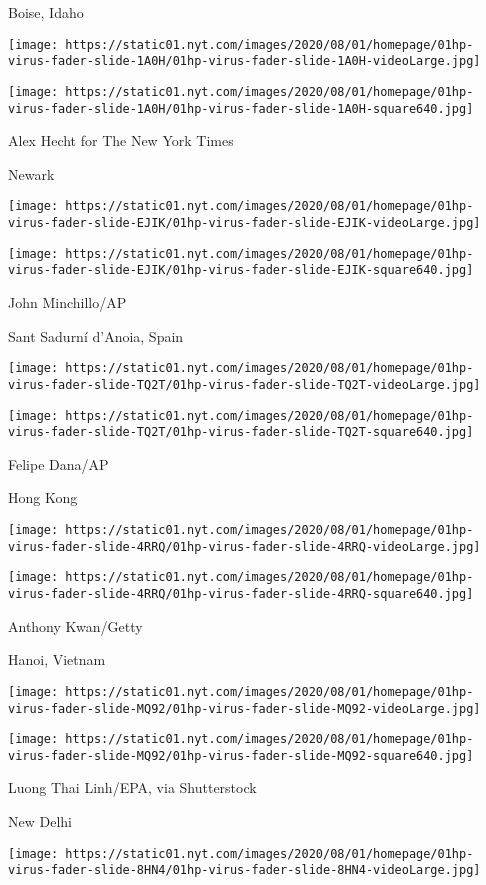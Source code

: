 Boise, Idaho

\texttt{[image: https://static01.nyt.com/images/2020/08/01/homepage/01hp-virus-fader-slide-1A0H/01hp-virus-fader-slide-1A0H-videoLarge.jpg]}

\texttt{[image: https://static01.nyt.com/images/2020/08/01/homepage/01hp-virus-fader-slide-1A0H/01hp-virus-fader-slide-1A0H-square640.jpg]}

 Alex Hecht for The New York Times

Newark

\texttt{[image: https://static01.nyt.com/images/2020/08/01/homepage/01hp-virus-fader-slide-EJIK/01hp-virus-fader-slide-EJIK-videoLarge.jpg]}

\texttt{[image: https://static01.nyt.com/images/2020/08/01/homepage/01hp-virus-fader-slide-EJIK/01hp-virus-fader-slide-EJIK-square640.jpg]}

 John Minchillo/AP

Sant Sadurní d'Anoia, Spain

\texttt{[image: https://static01.nyt.com/images/2020/08/01/homepage/01hp-virus-fader-slide-TQ2T/01hp-virus-fader-slide-TQ2T-videoLarge.jpg]}

\texttt{[image: https://static01.nyt.com/images/2020/08/01/homepage/01hp-virus-fader-slide-TQ2T/01hp-virus-fader-slide-TQ2T-square640.jpg]}

 Felipe Dana/AP

Hong Kong

\texttt{[image: https://static01.nyt.com/images/2020/08/01/homepage/01hp-virus-fader-slide-4RRQ/01hp-virus-fader-slide-4RRQ-videoLarge.jpg]}

\texttt{[image: https://static01.nyt.com/images/2020/08/01/homepage/01hp-virus-fader-slide-4RRQ/01hp-virus-fader-slide-4RRQ-square640.jpg]}

 Anthony Kwan/Getty

Hanoi, Vietnam

\texttt{[image: https://static01.nyt.com/images/2020/08/01/homepage/01hp-virus-fader-slide-MQ92/01hp-virus-fader-slide-MQ92-videoLarge.jpg]}

\texttt{[image: https://static01.nyt.com/images/2020/08/01/homepage/01hp-virus-fader-slide-MQ92/01hp-virus-fader-slide-MQ92-square640.jpg]}

 Luong Thai Linh/EPA, via Shutterstock

New Delhi

\texttt{[image: https://static01.nyt.com/images/2020/08/01/homepage/01hp-virus-fader-slide-8HN4/01hp-virus-fader-slide-8HN4-videoLarge.jpg]}

